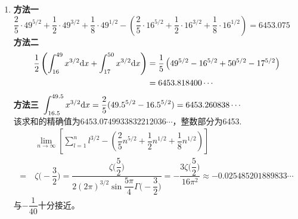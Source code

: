 \begin{enumerate}[label={\textbf{\arabic*.}},leftmargin=
    \inteval{\myenumleftmargin}pt]
\item 
\textbf{方法一}\ 
$ \dfrac{2}{5}\cdot 49^{5/2}+\dfrac{1}{2}\cdot 49^{3/2}+\dfrac{1}{8}
\cdot 49^{1/2}-\left(
\dfrac{2}{5}\cdot 16^{5/2}+\dfrac{1}{2}\cdot 16^{3/2}+\dfrac{1}{8}\cdot 16^{1/2}\right)=6453.075 $  \\
\textbf{方法二}\ 
\begin{align*}
    \dfrac{1}{2}\left(\int_{16}^{49}x^{3/2}\mathrm{d} x+\int_{17}^{50}x^{3/2}
    \mathrm{d} x \right) &= \dfrac{1}{5}\left( 49^{5/2} -16^{5/2}+50^{5/2}-17^{5/2} 
    \right)\\ &= 6453.818400 \cdots
\end{align*}
\textbf{方法三}\ $ \displaystyle \int_{16.5}^{49.5}x^{3/2}\mathrm{d} x=
\dfrac{2}{5}(49.5^{5/2}-16.5^{5/2})=6453.260838 \cdots $ \\
该求和的精确值为$ 6453.0749933832212036\cdots $，整数部分为6453. \\
\begin{align*}
    &\ \lim\limits_{n\to \infty} \left[ \sum\limits_{l=1}^{n} l^{3/2}-
    \left(\dfrac{2}{5}n^{5/2}+\dfrac{1}{2}n^{1/2}+\dfrac{1}{8}n^{1/2}
    \right)\right]\\ 
    =&\ \zeta\Big(-\dfrac{3}{2}\Big)=\dfrac{\zeta\Big(\dfrac{5}{2}\Big)}
    {2(2\pi)^{3/2}\sin\dfrac{5\pi}{4}\Gamma\Big(-\dfrac{3}{2}\Big)}
    =-\dfrac{3\zeta\Big(\dfrac{5}{2}\Big)}{16\pi^2} \approx -0.025485201889833\cdots
\end{align*}
与$ -\dfrac{1}{40} $十分接近。


\end{enumerate}
